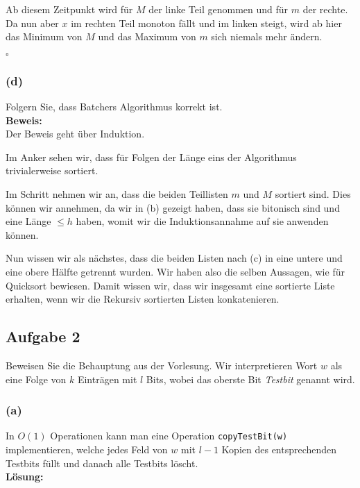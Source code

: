 \documentclass[11pt,a4paper,ngerman]{article}
\begin{document}
Ab diesem Zeitpunkt wird für $M$ der linke Teil genommen und für $m$ der rechte. Da nun aber $x$ im rechten Teil monoton fällt und im linken steigt,
wird ab hier das Minimum von $M$ und das Maximum von $m$ sich niemals mehr ändern.

\mbox{}\hfill$\square$

\subsubsection*{(d)}
Folgern Sie, dass Batchers Algorithmus korrekt ist.\\

\noindent\textbf{Beweis:}\\

Der Beweis geht über Induktion.

Im Anker sehen wir, dass für Folgen der Länge eins der Algorithmus trivialerweise sortiert.

Im Schritt nehmen wir an, dass die beiden Teillisten $m$ und $M$ sortiert sind. Dies können wir annehmen, da wir in (b) gezeigt haben, dass
sie bitonisch sind und eine Länge $\leq h$ haben, womit wir die Induktionsannahme auf sie anwenden können.

Nun wissen wir als nächstes, dass die beiden Listen nach (c) in eine untere und eine obere Hälfte getrennt wurden. Wir haben also die selben Aussagen, wie für Quicksort bewiesen. Damit wissen wir, dass wir insgesamt eine sortierte Liste erhalten, wenn wir die Rekursiv sortierten Listen konkatenieren.



\subsection*{Aufgabe 2}
Beweisen Sie die Behauptung aus der Vorlesung. Wir interpretieren Wort $w$ als eine Folge von $k$ Einträgen mit $l$ Bits, wobei das oberste Bit \emph{Testbit} genannt wird.

\subsubsection*{(a)}
In $O(1)$ Operationen kann man eine Operation \lstinline|copyTestBit(w)| implementieren, welche jedes Feld von $w$ mit $l-1$ Kopien des entsprechenden Testbits füllt und danach alle Testbits löscht.\\

\noindent\textbf{Lösung:}\\
\end{document}
